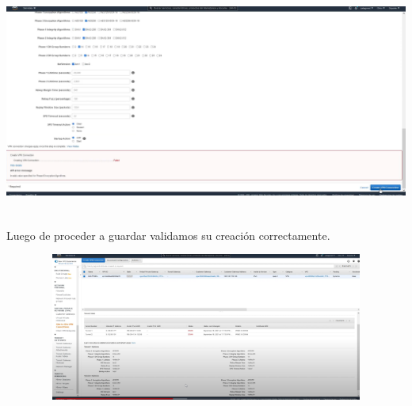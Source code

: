 \documentclass{article} %
\begin{document}
\noindent 

\noindent \includegraphics*[width=6.62in, height=2.95in, trim=0.00in 0.83in 1.54in 0.00in]{image20}

\noindent 

\noindent 

\noindent Luego de proceder a guardar validamos su creaci\'{o}n correctamente. 

\noindent 

\noindent 

\noindent \includegraphics*[width=6.13in, height=1.91in, trim=0.00in 1.21in 0.53in 0.00in]{image21}

\noindent 

\noindent 

\noindent 

\noindent 

\noindent 

\noindent 

\noindent 

\noindent 

\noindent 

\noindent 

\noindent 

\noindent 

\noindent 

\noindent 
\end{document}

